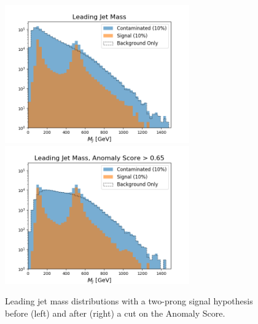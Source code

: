 \documentclass[12pt, a4paper]{article}
\begin{document}
\begin{figure}[H]
	\begin{center}
		\includegraphics[width=225pt]{imgs/bugfix/2Prong_Contaminated_10p0_J_Mass_Multi_Lead_SaveForPaper.png}
		\includegraphics[width=225pt]{imgs/bugfix/2Prong_Contaminated_10p0_J_Mass_AnomScore0p65_Multi_Lead_SaveForPaper.png}
	\end{center}
	\caption{Leading jet mass distributions with a two-prong signal hypothesis before (left) and after (right) a cut on the Anomaly Score.}
	\label{fig:2P_lj_mass}
\end{figure}
\end{document}
